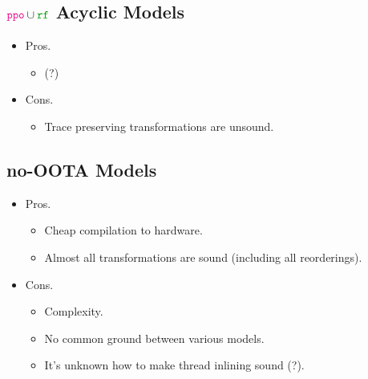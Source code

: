 \subsection{$\lPPO\cup\lRF$ Acyclic Models}

\begin{itemize}
  \item Pros.
  \begin{itemize}
    \item (?)
  \end{itemize}
  \item Cons.
  \begin{itemize}
    \item Trace preserving transformations are unsound.
  \end{itemize}
\end{itemize}

\subsection{no-OOTA Models}

\begin{itemize}
  \item Pros.
  \begin{itemize}
    \item Cheap compilation to hardware.
    \item Almost all transformations are sound (including all reorderings). 
  \end{itemize}
  \item Cons.
  \begin{itemize}
    \item Complexity.
    \item No common ground between various models.
    \item It's unknown how to make thread inlining sound (?).
  \end{itemize}
\end{itemize}

\newpage
\onecolumn

